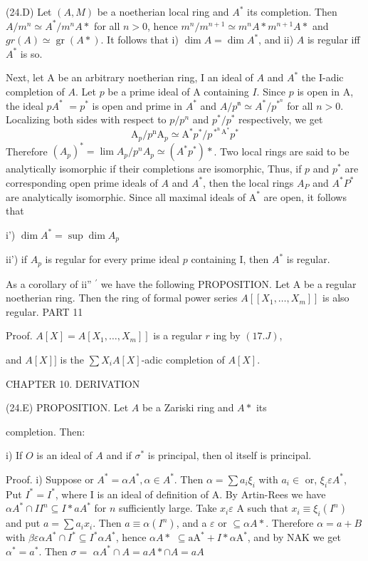 (24.D) Let $(A, M)$ be a noetherian local ring and $A^{*}$ its completion. Then $A / m^{n} \simeq A^{*} / m^{n} A *$ for all $n>0$, hence $m^{n} / m^{n+1} \simeq m^{n} A * m^{n+1} A *$ and $g r(A) \simeq \operatorname{gr}(A *) .$ It follows that i) $\operatorname{dim} A=\operatorname{dim} A^{*}$, and ii) $A$ is regular iff $A^{*}$ is so.

Next, let A be an arbitrary noetherian ring, I an ideal of $A$ and $A^{*}$ the I-adic completion of $A$. Let $p$ be a prime ideal of A containing $I$. Since $p$ is open in A, the ideal $p A^{*}$ $=p^{*}$ is open and prime in $A^{*}$ and $A / p^{\mathfrak{n}} \simeq A^{*} / p^{*^{n}}$ for all $n>0$. Localizing both sides with respect to $p / p^{n}$ and $p^{*} / p^{*}$ respectively, we get
$$
\mathrm{A}_{p} / p^{\mathrm{n}} \mathrm{A}_{p} \simeq \mathrm{A}^{*} p^{*} / p^{*^{\mathrm{n}} \mathrm{A}^{*}} p^{*}
$$
Therefore $\left(A_{p}\right)^{*}=\lim A_{p} / p^{n} A_{p} \simeq\left(A^{*} p^{*}\right) *$. Two local rings are said to be analytically isomorphic if their completions are isomorphic, Thus, if $p$ and $p^{*}$ are corresponding open prime ideals of $A$ and $A^{*}$, then the local rings $A_{P}$ and $A^{*} P^{*}$ are analytically isomorphic. Since all maximal ideals of $\mathrm{A}^{*}$ are open, it follows that

i') $\operatorname{dim} A^{*}=\sup \operatorname{dim} A_{p}$

ii') if $A_{p}$ is regular for every prime ideal $p$ containing I, then $A^{*}$ is regular.

As a corollary of ii'' $^{\prime}$ we have the following PROPOSITION. Let A be a regular noetherian ring. Then the ring of formal power series $A\left[\left[X_{1}, \ldots, X_{m}\right]\right]$ is also regular. PART 11

Proof. $\left.A[X]=A\left[X_{1}, \ldots, X_{m}\right]\right]$ is a regular $r$ ing by $(17 . J)$,

and $A[X]]$ is the $\sum X_{i} A[X]$-adic completion of $A[X]$.

CHAPTER 10. DERIVATION

(24.E) PROPOSITION. Let $A$ be a Zariski ring and $A *$ its

completion. Then:

i) If $O$ is an ideal of $A$ and if $\sigma^{*}$ is principal, then ol itself is principal.

Proof. i) Suppose or $A^{*}=\alpha A^{*}, \alpha \in A^{*}$. Then $\alpha=\sum a_{i} \xi_{i}$ with $a_{i} \in$ or, $\xi_{i} \varepsilon A^{*}$, Put $I^{*}=I^{*}$, where I is an ideal of definition of A. By Artin-Rees we have $\alpha A^{*} \cap I I^{n} \subseteq I * a A^{*}$ for $n$ sufficiently large. Take $x_{i} \varepsilon$ A such that $x_{i} \equiv \xi_{i}\left(I^{n}\right)$ and put $a=\sum a_{i} x_{i}$. Then $a \equiv \alpha\left(I^{n}\right)$, and a $\varepsilon$ or $\subseteq \alpha A *$. Therefore $\alpha=a+B$ with $\beta \varepsilon \alpha A^{*} \cap I^{*} \subseteq I^{*} \alpha A^{*}$, hence $\alpha A *$ $\subseteq \mathrm{aA}^{*}+I * \alpha \mathrm{A}^{*}$, and by $\mathrm{NAK}$ we get $\alpha^{*}=a^{*}$. Then $\sigma=$ $\alpha A^{*} \cap A=a A * \cap A=a A$

